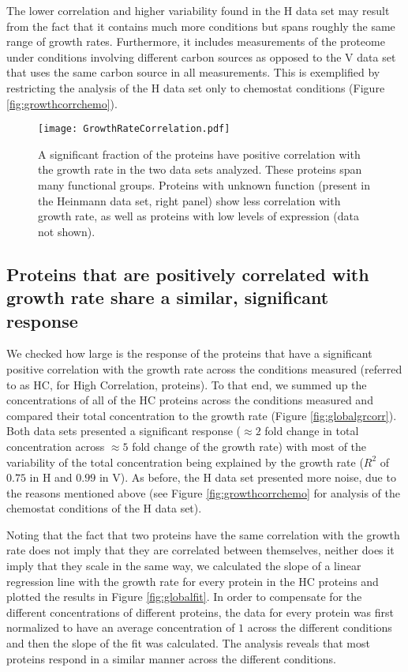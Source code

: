 \documentclass[a4paper,landscape,titlepage,17pt]{extarticle}
\begin{document}
The lower correlation and higher variability found in the H data set may result from the fact that it contains much more conditions but spans roughly the same range of growth rates.
Furthermore, it includes measurements of the proteome under conditions involving different carbon sources as opposed to the V data set that uses the same carbon source in all measurements.
This is exemplified by restricting the analysis of the H data set only to chemostat conditions (Figure \ref{fig:growthcorrchemo}).


\begin{figure}[h]
\centering
\texttt{[image: GrowthRateCorrelation.pdf]}
\caption{\linespread{0.5}\selectfont{}
A significant fraction of the proteins have positive correlation with the growth rate in the two data sets analyzed.
These proteins span many functional groups.
Proteins with unknown function (present in the Heinmann data set, right panel) show less correlation with growth rate, as well as proteins with low levels of expression (data not shown).
}
\label{fig:growthcorr}
\end{figure}

\clearpage        
\subsection*{Proteins that are positively correlated with growth rate share a similar, significant response}
We checked how large is the response of the proteins that have a significant positive correlation with the growth rate across the conditions measured (referred to as HC, for High Correlation, proteins).
To that end, we summed up the concentrations of all of the HC proteins across the conditions measured and compared their total concentration to the growth rate (Figure \ref{fig:globalgrcorr}).
Both data sets presented a significant response ($\approx 2$ fold change in total concentration across $\approx 5$ fold change of the growth rate) with most of the variability of the total concentration being explained by the growth rate ($R^2$ of $0.75$ in H and $0.99$ in V). 
As before, the H data set presented more noise, due to the reasons mentioned above (see Figure \ref{fig:growthcorrchemo} for analysis of the chemostat conditions of the H data set).

Noting that the fact that two proteins have the same correlation with the growth rate does not imply that they are correlated between themselves, neither does it imply that they scale in the same way, we calculated the slope of a linear regression line with the growth rate for every protein in the HC proteins and plotted the results in Figure \ref{fig:globalfit}.
In order to compensate for the different concentrations of different proteins, the data for every protein was first normalized to have an average concentration of $1$ across the different conditions and then the slope of the fit was calculated.
The analysis reveals that most proteins respond in a similar manner across the different conditions.
\end{document}
